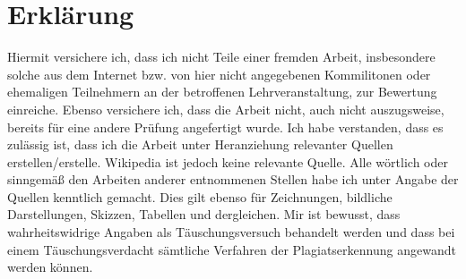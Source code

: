 \documentclass{Gharaei}
\begin{document}
\section {Erklärung}
Hiermit versichere ich, dass ich nicht Teile einer fremden Arbeit, insbesondere solche aus dem Internet bzw. von hier nicht angegebenen Kommilitonen oder ehemaligen Teilnehmern an der betroffenen Lehrveranstaltung, zur Bewertung einreiche. Ebenso versichere ich, dass die Arbeit nicht, auch nicht auszugsweise, bereits für eine andere Prüfung angefertigt wurde. Ich habe verstanden, dass es zulässig ist, dass ich die Arbeit unter Heranziehung relevanter Quellen erstellen/erstelle. Wikipedia ist jedoch keine relevante Quelle. Alle wörtlich oder sinngemäß den Arbeiten anderer entnommenen Stellen habe ich unter Angabe der Quellen kenntlich gemacht. Dies gilt ebenso für Zeichnungen, bildliche Darstellungen, Skizzen, Tabellen und dergleichen.  Mir ist bewusst, dass wahrheitswidrige Angaben als Täuschungsversuch behandelt werden und dass bei einem Täuschungsverdacht sämtliche Verfahren der Plagiatserkennung angewandt werden können.
\end{document}
